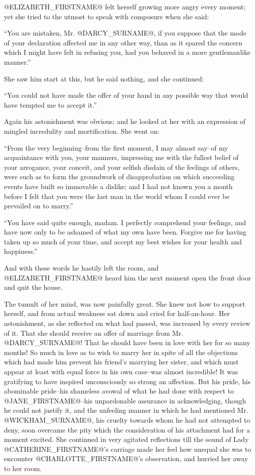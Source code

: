 @ELIZABETH_FIRSTNAME@ felt herself growing more angry every moment; yet she tried to
the utmost to speak with composure when she said:

``You are mistaken, Mr. @DARCY_SURNAME@, if you suppose that the mode of your
declaration affected me in any other way, than as it spared the concern
which I might have felt in refusing you, had you behaved in a more
gentlemanlike manner.''

She saw him start at this, but he said nothing, and she continued:

``You could not have made the offer of your hand in any possible way that
would have tempted me to accept it.''

Again his astonishment was obvious; and he looked at her with an
expression of mingled incredulity and mortification. She went on:

``From the very beginning--from the first moment, I may almost say--of
my acquaintance with you, your manners, impressing me with the fullest
belief of your arrogance, your conceit, and your selfish disdain of
the feelings of others, were such as to form the groundwork of
disapprobation on which succeeding events have built so immovable a
dislike; and I had not known you a month before I felt that you were the
last man in the world whom I could ever be prevailed on to marry.''

``You have said quite enough, madam. I perfectly comprehend your
feelings, and have now only to be ashamed of what my own have been.
Forgive me for having taken up so much of your time, and accept my best
wishes for your health and happiness.''

And with these words he hastily left the room, and @ELIZABETH_FIRSTNAME@ heard him
the next moment open the front door and quit the house.

The tumult of her mind, was now painfully great. She knew not how
to support herself, and from actual weakness sat down and cried for
half-an-hour. Her astonishment, as she reflected on what had passed,
was increased by every review of it. That she should receive an offer of
marriage from Mr. @DARCY_SURNAME@! That he should have been in love with her for
so many months! So much in love as to wish to marry her in spite of
all the objections which had made him prevent his friend's marrying
her sister, and which must appear at least with equal force in his
own case--was almost incredible! It was gratifying to have inspired
unconsciously so strong an affection. But his pride, his abominable
pride--his shameless avowal of what he had done with respect to
@JANE_FIRSTNAME@--his unpardonable assurance in acknowledging, though he could
not justify it, and the unfeeling manner in which he had mentioned Mr.
@WICKHAM_SURNAME@, his cruelty towards whom he had not attempted to deny, soon
overcame the pity which the consideration of his attachment had for
a moment excited. She continued in very agitated reflections till the
sound of Lady @CATHERINE_FIRSTNAME@'s carriage made her feel how unequal she was to
encounter @CHARLOTTE_FIRSTNAME@'s observation, and hurried her away to her room.



